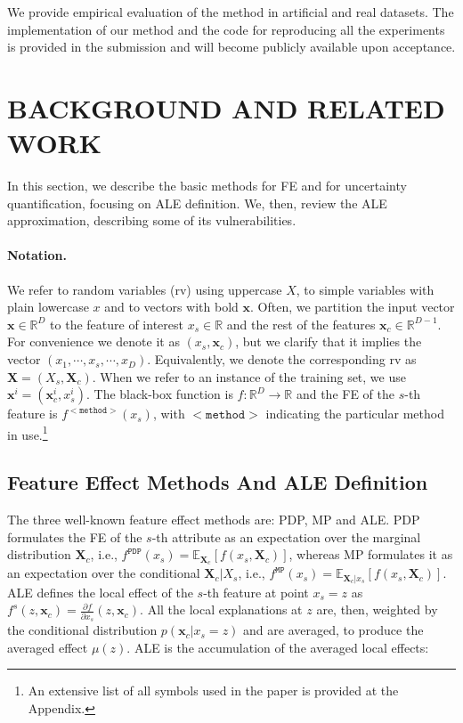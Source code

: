 \documentclass[twoside]{article}
\newcommand{\xc}{\mathbf{x}_c}
\newcommand{\xb}{\mathbf{x}}
\begin{document}
We provide empirical evaluation of the method in artificial and real
datasets. The implementation of our method and the code for
reproducing all the experiments is provided in the submission and will
become publicly available upon acceptance.


\section{BACKGROUND AND RELATED WORK}

In this section, we describe the basic methods for FE and for
uncertainty quantification, focusing on ALE definition. We, then,
review the ALE approximation\citep{apley2020visualizing, gkolemis22},
describing some of its vulnerabilities.

\paragraph{Notation.} We refer to random variables (rv) using
uppercase \( X \), to simple variables with plain lowercase \( x \)
and to vectors with bold \( \xb \). Often, we partition the input
vector \(\xb \in \mathbb{R}^D\) to the feature of interest
\(x_s \in \mathbb{R} \) and the rest of the features
\(\xc \in \mathbb{R}^{D-1}\). For convenience we denote it as
\((x_s, \mathbf{x}_c)\), but we clarify that it implies the vector
\((x_1, \cdots , x_s, \cdots, x_D)\). Equivalently, we denote the
corresponding rv as \(\mathbf{X} = (X_s, \mathbf{X}_c)\). When we
refer to an instance of the training set, we use
\(\xb^i= (\xc^i, x_s^i) \). The black-box function is
\(f : \mathbb{R}^D \rightarrow \mathbb{R}\) and the FE of the \(s\)-th
feature is \(f^{\mathtt{<method>}}(x_s)\), with \(\mathtt{<method>}\)
indicating the particular method in use.\footnote{An extensive list of all
  symbols used in the paper is provided at the Appendix.}

\subsection{Feature Effect Methods And ALE Definition}
\label{sec:feat-effect-meth}

The three well-known feature effect methods are: PDP, MP and ALE. PDP
formulates the FE of the \(s\)-th attribute as an expectation over the
marginal distribution \(\mathbf{X}_c\), i.e.,
\(f^{\mathtt{PDP}}(x_s) =
\mathbb{E}_{\mathbf{X}_c}[f(x_s,\mathbf{X}_c)]\), whereas MP
formulates it as an expectation over the conditional
\(\mathbf{X}_c|X_s\), i.e.,
\(f^{\mathtt{MP}}(x_s) = \mathbb{E}_{\mathbf{X}_c|x_s}[f(x_s,
\mathbf{X}_c)]\). ALE defines the local effect of the \(s\)-th feature
at point \(x_s = z\) as
\(f^s(z, \xc) = \frac{\partial f}{\partial x_s} (z, \xc)\). All the
local explanations at \(z\) are, then, weighted by the conditional
distribution \(p(\xc|x_s=z)\) and are averaged, to produce the
averaged effect \(\mu(z)\). ALE is the accumulation of the averaged
local effects:
\end{document}
